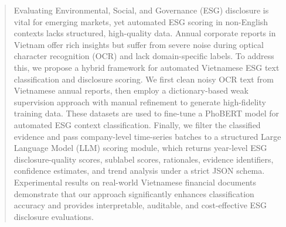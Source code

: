 \documentclass{article}
\theoremstyle{plain}
\theoremstyle{definition}
\theoremstyle{remark}
\begin{document}

\printAffiliationsAndNotice{\icmlEqualContribution}

\begin{abstract}
Evaluating Environmental, Social, and Governance (ESG) disclosure is vital for emerging markets, yet automated ESG scoring in non-English contexts lacks structured, high-quality data. Annual corporate reports in Vietnam offer rich insights but suffer from severe noise during optical character recognition (OCR) and lack domain-specific labels. To address this, we propose a hybrid framework for automated Vietnamese ESG text classification and disclosure scoring. We first clean noisy OCR text from Vietnamese annual reports, then employ a dictionary-based weak supervision approach with manual refinement to generate high-fidelity training data. These datasets are used to fine-tune a PhoBERT model for automated ESG context classification. Finally, we filter the classified evidence and pass company-level time-series batches to a structured Large Language Model (LLM) scoring module, which returns year-level ESG disclosure-quality scores, sublabel scores, rationales, evidence identifiers, confidence estimates, and trend analysis under a strict JSON schema. Experimental results on real-world Vietnamese financial documents demonstrate that our approach significantly enhances classification accuracy and provides interpretable, auditable, and cost-effective ESG disclosure evaluations.
\end{abstract}
\end{document}
